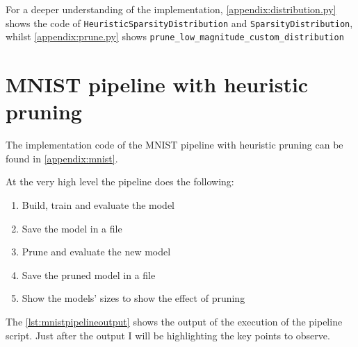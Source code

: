 For a deeper understanding of the implementation,
\autoref{appendix:distribution.py} shows the code of
\texttt{HeuristicSparsityDistribution} and \texttt{SparsityDistribution},
whilst \autoref{appendix:prune.py} shows
\texttt{prune\_low\_magnitude\_custom\_distribution}

\section{MNIST pipeline with heuristic pruning}\label{sec:mnistpipeline}
The implementation code of the MNIST pipeline with heuristic pruning can be
found in \autoref{appendix:mnist}.

At the very high level the pipeline does the following:
\begin{enumerate}
    \item Build, train and evaluate the model
    \item Save the model in a file
    \item Prune and evaluate the new model
    \item Save the pruned model in a file
    \item Show the models' sizes to show the effect of pruning
\end{enumerate}

The \autoref{lst:mnistpipelineoutput} shows the output of the execution of the
pipeline script. Just after the output I will be highlighting the key points to
observe.

